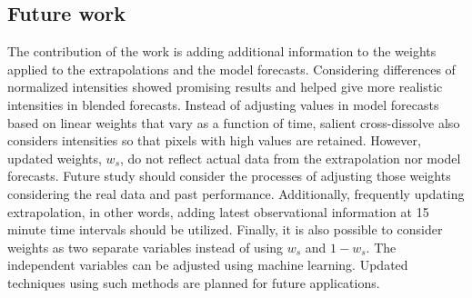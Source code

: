 \documentclass[12pt]{article}
\begin{document}
\subsection{Future work}
The contribution of the work is adding additional information to the weights applied to the extrapolations and the model forecasts. Considering differences of normalized intensities showed promising results and helped give more realistic intensities in blended forecasts. Instead of adjusting values in model forecasts based on linear weights that vary as a function of time, salient cross-dissolve also considers intensities so that pixels with high values are retained. However, updated weights, $w_{s}$, do not reflect actual data from the extrapolation nor model forecasts. Future study should consider the processes of adjusting those weights considering the real data and past performance. Additionally, frequently updating extrapolation, in other words, adding latest observational information at 15 minute time intervals should be utilized. Finally, it is also possible to consider weights as two separate variables instead of using $w_{s}$ and $1-w_{s}$. The independent variables can be adjusted using machine learning. Updated techniques using such methods are planned for future applications.  







\newpage

\end{document}
